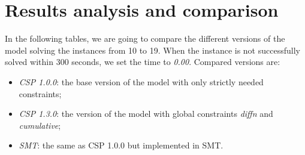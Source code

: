 \section{Results analysis and comparison}
In the following tables, we are going to compare the different versions of the model solving the instances from 10 to 19. When the instance is not successfully solved within 300 seconds, we set the time to \emph{0.00}. 
Compared versions are: 
\begin{itemize}
    \item \emph{CSP 1.0.0}: the base version of the model with only strictly needed constraints;
    \item \emph{CSP 1.3.0}: the version of the model with global constraints \emph{diffn} and \emph{cumulative};
    \item \emph{SMT}: the same as CSP 1.0.0 but implemented in SMT. 
\end{itemize}
